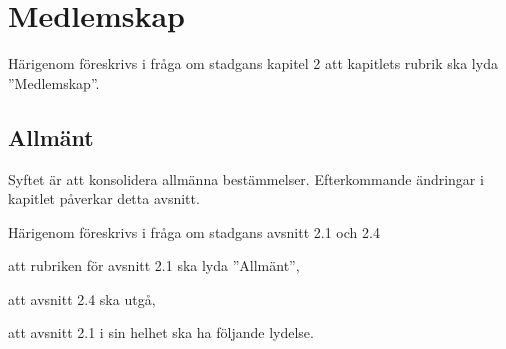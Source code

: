 \documentclass{article}
\begin{document}
\section{Medlemskap}
Härigenom föreskrivs i fråga om stadgans kapitel 2 att kapitlets rubrik ska lyda ''Medlemskap''.

\subsection{Allmänt}
Syftet är att konsolidera allmänna bestämmelser.
Efterkommande ändringar i kapitlet påverkar detta avsnitt.

Härigenom föreskrivs i fråga om stadgans avsnitt 2.1 och 2.4
\begin{dels}
    \item att rubriken för avsnitt 2.1 ska lyda ''Allmänt'',
    \item att avsnitt 2.4 ska utgå,
    \item att avsnitt 2.1 i sin helhet ska ha följande lydelse.
\end{dels}
\end{document}
